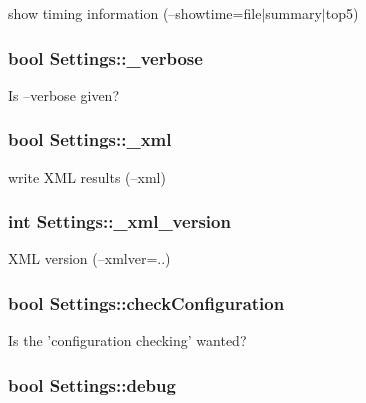 show timing information (--showtime=file$|$summary$|$top5) 

\hypertarget{class_settings_a4cbeac0f69cfe67ea995b2e8b03543fe}{
\subsubsection[{\-\_\-verbose}]{\setlength{\rightskip}{0pt plus 5cm}bool Settings\-::\-\_\-verbose}}\label{class_settings_a4cbeac0f69cfe67ea995b2e8b03543fe}


Is --verbose given? 

\hypertarget{class_settings_ab657e8c6731499441e902246a0697be0}{
\subsubsection[{\-\_\-xml}]{\setlength{\rightskip}{0pt plus 5cm}bool Settings\-::\-\_\-xml}}\label{class_settings_ab657e8c6731499441e902246a0697be0}


write X\-M\-L results (--xml) 

\hypertarget{class_settings_abfe06684500ddd333513a0b0c2abb023}{
\subsubsection[{\-\_\-xml\-\_\-version}]{\setlength{\rightskip}{0pt plus 5cm}int Settings\-::\-\_\-xml\-\_\-version}}\label{class_settings_abfe06684500ddd333513a0b0c2abb023}


X\-M\-L version (--xmlver=..) 

\hypertarget{class_settings_a56346f5b3dd9313608b3b9b7b4310e60}{
\subsubsection[{check\-Configuration}]{\setlength{\rightskip}{0pt plus 5cm}bool Settings\-::check\-Configuration}}\label{class_settings_a56346f5b3dd9313608b3b9b7b4310e60}
Is the 'configuration checking' wanted? \hypertarget{class_settings_ad9ae775f5f68995dd70b263ff006d5dd}{
\subsubsection[{debug}]{\setlength{\rightskip}{0pt plus 5cm}bool Settings\-::debug}}\label{class_settings_ad9ae775f5f68995dd70b263ff006d5dd}


